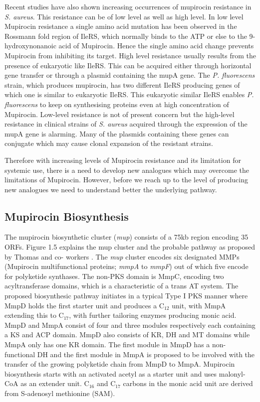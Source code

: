 		Recent studies \parencite{Patel2009, Thomas2010} have also shown increasing occurrences of mupirocin resistance in \textit{S. aureus}. This resistance can be of low level as well as high level. In low level Mupirocin resistance a single amino acid mutation has been observed in the Rossmann fold region of IleRS, which normally binds to the ATP or else to the 9-hydroxynonanoic acid of Mupirocin. Hence the single amino acid change prevents Mupirocin from inhibiting its target. High level resistance usually results from the presence of eukaryotic like IleRS. This can be acquired either through horizontal gene transfer or through a plasmid containing the mupA gene. The \textit{P. fluorescens} strain, which produces mupirocin, has two different IleRS producing genes of which one is similar to eukaryotic IleRS. This eukaryotic similar IleRS enables \textit{P. fluorescens} to keep on synthesising proteins even at high concentration of Mupirocin. Low-level resistance is not of present concern but the high-level resistance in clinical strains of \textit{S. aureus} acquired through the expression of the mupA gene is alarming. Many of the plasmids containing these genes can conjugate which may cause clonal expansion of the resistant strains.
		
		Therefore with increasing levels of Mupirocin resistance and its limitation for systemic use, there is a need to develop new analogues which may overcome the limitations of Mupirocin. However, before we reach up to the level of producing new analogues we need to understand better the underlying pathway.
		
		\subsection{Mupirocin Biosynthesis}
		\label{sec:MupBiosynthesis}
		The mupirocin biosynthetic cluster (\textit{mup}) consists of a 75kb region encoding 35 ORFs. Figure 1.5 explains the mup cluster and the probable pathway as proposed by Thomas and co- workers \parencite{Thomas2010, Gurney2011}. The \textit{mup} cluster encodes six designated MMPs (Mupirocin multifunctional proteins; \textit{mmpA} to \textit{mmpF}) out of which five encode for polyketide synthases. The non-PKS domain is MmpC, encoding two acyltransferase domains, which is a characteristic of a trans AT system. The proposed biosynthesic pathway initiates in a typical Type I PKS manner where MmpD holds the first starter unit and produces a C$ _{12} $ unit, with MmpA extending this to  C$_{17} $, with further tailoring enzymes producing monic acid. MmpD and MmpA consist of four and three modules respectively each containing a KS and ACP domain. MmpD also consists of KR, DH and MT domains while MmpA only has one KR domain. The first module in MmpD has a non-functional DH and the first module in MmpA is proposed to be involved with the transfer of the growing polyketide chain from MmpD to MmpA. Mupirocin biosynthesis starts with an activated acetyl as a starter unit and uses malonyl-CoA as an extender unit. C$_{16} $ and  C$_{17} $ carbons in the monic acid unit are derived from S-adenosyl methionine (SAM).

